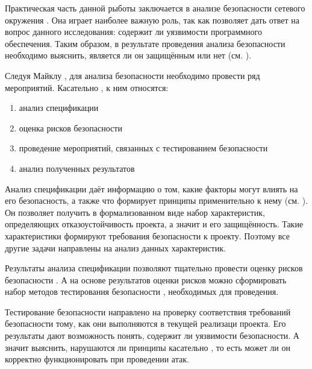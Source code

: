 %
Практическая часть данной рыботы заключается в анализе безопасности сетевого окружения \PeerHood. 
%
Она играет наиболее важную роль, так как позволяет дать ответ на вопрос данного исследования: содержит ли \PeerHood уязвимости программного обеспечения. 
%
Таким образом, в результате проведения анализа безопасности \PeerHood необходимо выяснить, является ли он защищённым  или нет (см. ). 

%
Следуя Майклу , для анализа безопасности  необходимо провести ряд мероприятий. 
%
Касательно \PeerHood, к ним относятся:
\begin{enumerate}
	\leftskip2em%
	\setlength{\itemsep}{0pt}%
	\setlength{\parsep}{0pt}%

	\item анализ спецификации
	\item оценка рисков безопасности
	\item проведение мероприятий, связанных с тестированием безопасности
	\item анализ полученных результатов
\end{enumerate} 

%
%
%

%
Анализ спецификации \PeerHood даёт информацию о том, какие факторы могут влиять на его безопасность, а также что формирует принципы \CIATriad применительно к нему (см. ). 
%
Он позволяет получить в формализованном виде набор характеристик, определяющих отказоустойчивость проекта, а значит и его защищённость. 
%
Такие характеристики формируют требования безопасности к проекту. 
%
Поэтому все другие задачи направлены на анализ данных характеристик. 

%
Результаты анализа спецификации позволяют тщательно провести оценку рисков безопасности \PeerHood. 
%
А на основе результатов оценки рисков можно сформировать набор методов тестирования безопасности , необходимых для проведения. 

%
Тестирование безопасности \PeerHood направлено на проверку соответствия требований безопасности тому, как они выполняются в текущей реализаци проекта. 
%
Его результаты дают возможность понять, содержит ли \PeerHood уязвимости безопасности. 
%
А значит выяснить, нарушаются ли принципы \CIATriad касательно \PeerHood, то есть может ли он корректно функционировать при проведении атак.